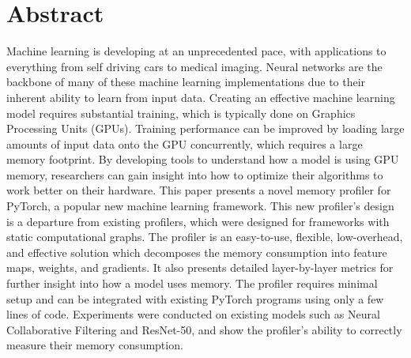 \documentclass[12pt,letterpaper]{article}
\begin{document}
\thispagestyle{empty}

\clearpage
\tableofcontents
\newpage

\listoffigures
\newpage 

\section{Abstract}
Machine learning is developing at an unprecedented pace, with applications to everything from self driving cars to medical imaging. Neural networks are the backbone of many of these machine learning implementations due to their inherent ability to learn from input data. Creating an effective machine learning model requires substantial training, which is typically done on Graphics Processing Units (GPUs). Training performance can be improved by loading large amounts of input data onto the GPU concurrently, which requires a large memory footprint. By developing tools to understand how a model is using GPU memory, researchers can gain insight into how to optimize their algorithms to work better on their hardware. This paper presents a novel memory profiler for PyTorch, a popular new machine learning framework. This new profiler's design is a departure from existing profilers, which were designed for frameworks with static computational graphs. The  profiler is an easy-to-use, flexible, low-overhead, and effective solution which decomposes the memory consumption into feature maps, weights, and gradients. It also presents detailed layer-by-layer metrics for further insight into how a model uses memory. The profiler requires minimal setup and can be integrated with existing PyTorch programs using only a few lines of code. Experiments were conducted on existing models such as Neural Collaborative Filtering and ResNet-50, and show the profiler's ability to correctly measure their memory consumption.
\par 


\end{document}
